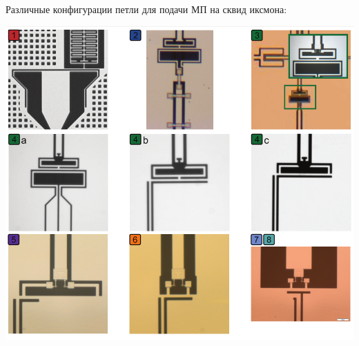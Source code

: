 \documentclass[aspectratio=169, 13pt, t]{beamer}
\begin{document}
\begin{frame}[t]\frametitle{\secname}\framesubtitle{\subsecname}
Различные конфигурации петли для подачи МП на сквид иксмона:

\vspace{.2cm}
\centering
\includegraphics[height=0.75\textheight]{perspective2}

\end{frame}
\end{document}
